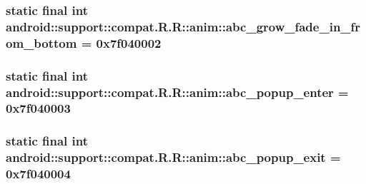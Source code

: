 \hypertarget{classandroid_1_1support_1_1compat_1_1_r_1_1anim_2312d0af7d994635a004d64d752809d1}{
\subsubsection[{abc\_\-grow\_\-fade\_\-in\_\-from\_\-bottom}]{\setlength{\rightskip}{0pt plus 5cm}static final int android::support::compat.R.R::anim::abc\_\-grow\_\-fade\_\-in\_\-from\_\-bottom = 0x7f040002}}
\label{classandroid_1_1support_1_1compat_1_1_r_1_1anim_2312d0af7d994635a004d64d752809d1}


\hypertarget{classandroid_1_1support_1_1compat_1_1_r_1_1anim_ed30290dbe1f3b0ee94fa81e961d9370}{
\subsubsection[{abc\_\-popup\_\-enter}]{\setlength{\rightskip}{0pt plus 5cm}static final int android::support::compat.R.R::anim::abc\_\-popup\_\-enter = 0x7f040003}}
\label{classandroid_1_1support_1_1compat_1_1_r_1_1anim_ed30290dbe1f3b0ee94fa81e961d9370}


\hypertarget{classandroid_1_1support_1_1compat_1_1_r_1_1anim_0aaaf25333a178dab22bb38af378b62c}{
\subsubsection[{abc\_\-popup\_\-exit}]{\setlength{\rightskip}{0pt plus 5cm}static final int android::support::compat.R.R::anim::abc\_\-popup\_\-exit = 0x7f040004}}
\label{classandroid_1_1support_1_1compat_1_1_r_1_1anim_0aaaf25333a178dab22bb38af378b62c}


